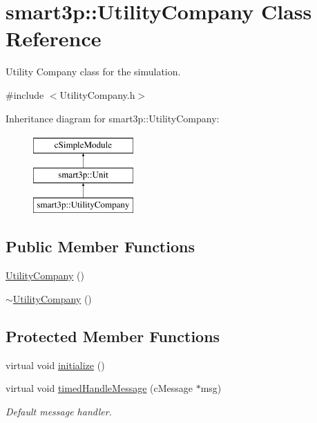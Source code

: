 \hypertarget{classsmart3p_1_1UtilityCompany}{}\section{smart3p\+:\+:Utility\+Company Class Reference}
\label{classsmart3p_1_1UtilityCompany}


Utility Company class for the simulation.  




{\ttfamily \#include $<$Utility\+Company.\+h$>$}

Inheritance diagram for smart3p\+:\+:Utility\+Company\+:\begin{figure}[H]
\begin{center}
\leavevmode
\includegraphics[height=3.000000cm]{classsmart3p_1_1UtilityCompany}
\end{center}
\end{figure}
\subsection*{Public Member Functions}
\begin{DoxyCompactItemize}
\item 
\hyperlink{classsmart3p_1_1UtilityCompany_a2f1eef975aa1798f09da1c1fa79abbe9}{Utility\+Company} ()
\item 
\hyperlink{classsmart3p_1_1UtilityCompany_a6f820a1b7abefa4b2a3cfbe694c7bfc6}{$\sim$\+Utility\+Company} ()
\end{DoxyCompactItemize}
\subsection*{Protected Member Functions}
\begin{DoxyCompactItemize}
\item 
virtual void \hyperlink{classsmart3p_1_1UtilityCompany_a3f7eb4fc092b71349f3ed616e35fba3e}{initialize} ()
\item 
virtual void \hyperlink{classsmart3p_1_1UtilityCompany_af5ce80d9f1d293c9be21fa65668c0e74}{timed\+Handle\+Message} (c\+Message $\ast$msg)
\begin{DoxyCompactList}\small\item\em Default message handler. \end{DoxyCompactList}\end{DoxyCompactItemize}
